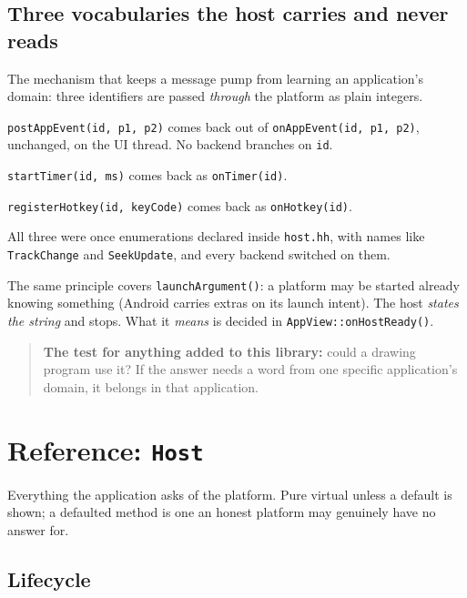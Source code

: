 \documentclass[11pt,a4paper]{article}
\begin{document}
\subsection{Three vocabularies the host carries and never reads}

The mechanism that keeps a message pump from learning an application's domain:
three identifiers are passed \emph{through} the platform as plain integers.

\begin{description}[leftmargin=1.5em]
\item[App events] \texttt{postAppEvent(id, p1, p2)} comes back out of
  \texttt{onAppEvent(id, p1, p2)}, unchanged, on the UI thread. No backend
  branches on \texttt{id}.
\item[Timer ids] \texttt{startTimer(id, ms)} comes back as
  \texttt{onTimer(id)}.
\item[Hotkey ids] \texttt{registerHotkey(id, keyCode)} comes back as
  \texttt{onHotkey(id)}.
\end{description}

All three were once enumerations declared inside \texttt{host.hh}, with names
like \texttt{TrackChange} and \texttt{SeekUpdate}, and every backend switched on
them.

The same principle covers \texttt{launchArgument()}: a platform may be started
already knowing something (Android carries extras on its launch intent). The
host \emph{states the string} and stops. What it \emph{means} is decided in
\texttt{AppView::onHostReady()}.

\begin{quote}
\textbf{The test for anything added to this library:} could a drawing program
use it? If the answer needs a word from one specific application's domain, it
belongs in that application.
\end{quote}

\section{Reference: \texttt{Host}}

Everything the application asks of the platform. Pure virtual unless a default
is shown; a defaulted method is one an honest platform may genuinely have no
answer for.

\subsection{Lifecycle}
\end{document}
